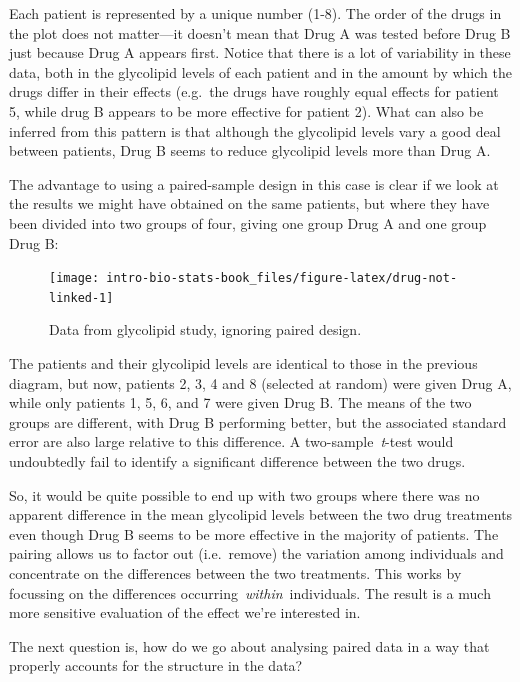 \documentclass[
]{book}
\begin{document}
Each patient is represented by a unique number (1-8). The order of the drugs in the plot does not matter---it doesn't mean that Drug A was tested before Drug B just because Drug A appears first. Notice that there is a lot of variability in these data, both in the glycolipid levels of each patient and in the amount by which the drugs differ in their effects (e.g.~the drugs have roughly equal effects for patient 5, while drug B appears to be more effective for patient 2). What can also be inferred from this pattern is that although the glycolipid levels vary a good deal between patients, Drug B seems to reduce glycolipid levels more than Drug A.

The advantage to using a paired-sample design in this case is clear if we look at the results we might have obtained on the same patients, but where they have been divided into two groups of four, giving one group Drug A and one group Drug B:

\begin{figure}

{\centering \texttt{[image: intro-bio-stats-book\_files/figure-latex/drug-not-linked-1]} 

}

\caption{Data from glycolipid study, ignoring paired design.}\label{fig:drug-not-linked}
\end{figure}

The patients and their glycolipid levels are identical to those in the previous diagram, but now, patients 2, 3, 4 and 8 (selected at random) were given Drug A, while only patients 1, 5, 6, and 7 were given Drug B. The means of the two groups are different, with Drug B performing better, but the associated standard error are also large relative to this difference. A two-sample~\emph{t}-test would undoubtedly fail to identify a significant difference between the two drugs.

So, it would be quite possible to end up with two groups where there was no apparent difference in the mean glycolipid levels between the two drug treatments even though Drug B seems to be more effective in the majority of patients. The pairing allows us to factor out (i.e.~remove) the variation among individuals and concentrate on the differences between the two treatments. This works by focussing on the differences occurring~\emph{within}~individuals. The result is a much more sensitive evaluation of the effect we're interested in.

The next question is, how do we go about analysing paired data in a way that properly accounts for the structure in the data?
\end{document}
